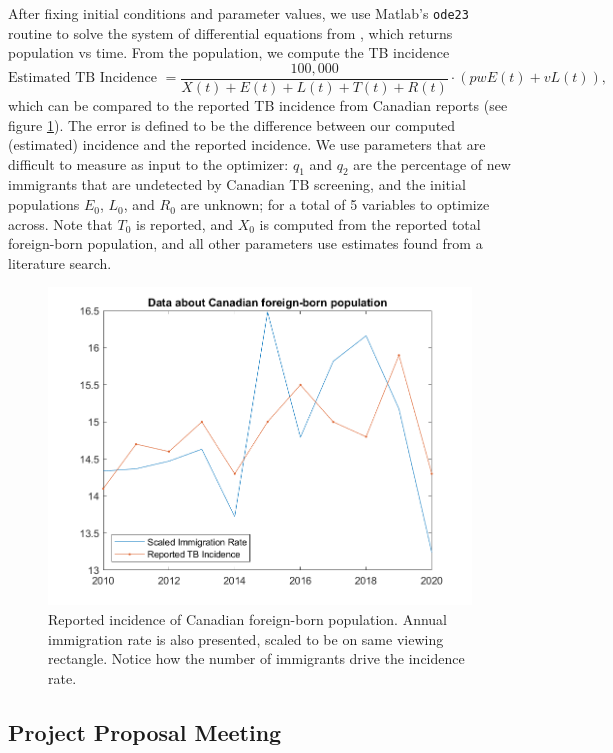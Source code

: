 \documentclass{article}
\begin{document}
After fixing initial conditions and parameter values, we use Matlab's \texttt{ode23} routine to solve the system of differential equations from \cite{GuoWu}, which returns population vs time.  From the population, we compute the TB incidence
$$\text{Estimated TB Incidence } = \frac{100,000}{X(t)+E(t)+L(t)+T(t)+R(t)} \cdot (pw E(t) + v L(t)) ,$$
which can be compared to the reported TB incidence from Canadian reports\cite{MounchiliA.2022TuberculosisReport} (see figure \ref{fig:foreignBornData}).  The error is defined to be the difference between our computed (estimated) incidence and the reported incidence.  We use parameters that are difficult to measure as input to the optimizer: $q_1$ and $q_2$ are the percentage of new immigrants that are undetected by Canadian TB screening, and the initial populations $E_0$, $L_0$, and $R_0$ are unknown; for a total of 5 variables to optimize across.  Note that $T_0$ is reported, and $X_0$ is computed from the reported total foreign-born population, and all other parameters use estimates found from a literature search.

\begin{figure}
	\centering 
	\includegraphics[scale=0.6]{foreignBornData}
	\caption{Reported incidence of Canadian foreign-born population.  Annual immigration rate is also presented, scaled to be on same viewing rectangle.  Notice how the number of immigrants drive the incidence rate.}
	\label{fig:foreignBornData}
\end{figure}


	\subsection{Project Proposal Meeting}
	
\end{document}
